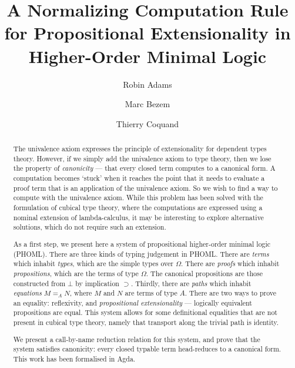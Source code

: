 \documentclass[a4paper,UKenglish]{lipics-v2016}
\title{A Normalizing Computation Rule for Propositional Extensionality in Higher-Order Minimal Logic
}
\author[1]{Robin Adams}
\author[1]{Marc Bezem}
\author[2]{Thierry Coquand}
\affil[1]{Universitetet i Bergen, Institutt for Informatikk, Postboks 7800, N-5020 BERGEN, Norway \\
  \texttt{\{robin.adams,bezem\}@ii.uib.no}}
\affil[2]{Chalmers tekniska högskola, Data- och informationsteknik, 412 96 Göteborg, Sweden \\
  \texttt{coquand@chalmers.se}}
\theoremstyle{plain}
\theoremstyle{definition}
\begin{document}
\maketitle

\begin{abstract}
The univalence axiom expresses the principle of extensionality for dependent types theory. However, if we simply add the univalence axiom to type theory, then we lose the property of \emph{canonicity} --- that every closed term computes to a canonical form. A computation becomes `stuck' when it reaches the point that it needs to evaluate a proof term that is an application of the univalence axiom. So we wish to find a way to compute with the univalence axiom. While this problem has been solved with the formulation of cubical type theory, where the computations are expressed using a nominal extension of lambda-calculus, it may be interesting to explore alternative solutions, which do not require such an extension.

As a first step, we present here a system of propositional higher-order minimal logic (PHOML).  There are three kinds of typing judgement in PHOML.  There are \emph{terms} which inhabit \emph{types}, which are the simple types over $\Omega$.  There are \emph{proofs} which inhabit \emph{propositions}, which are the terms of type $\Omega$.  The canonical propositions are those constructed from $\bot$ by implication $\supset$.  Thirdly, there are \emph{paths} which inhabit \emph{equations} $M =_A N$, where $M$ and $N$ are terms of type $A$.  There are two ways to prove an equality: reflexivity, and \emph{propositional extensionality} --- logically equivalent propositions are equal.  This system allows for some definitional equalities that are not present in cubical type theory, namely that transport along the trivial path is identity.

We present a call-by-name reduction relation for this system, and prove that the system satisfies canonicity: every closed typable term head-reduces to a canonical form.  This work has been formalised in Agda.
 \end{abstract}

\end{document}
